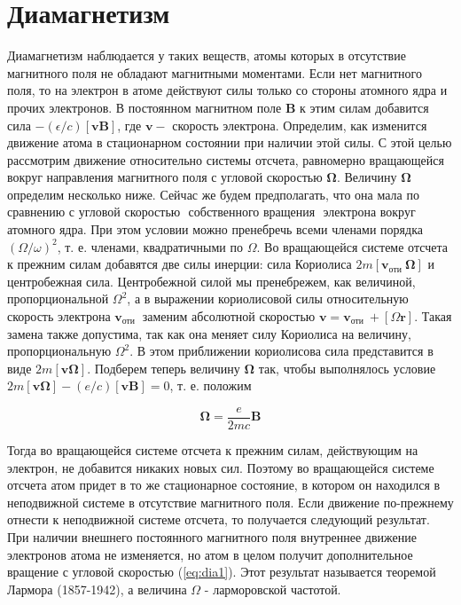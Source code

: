 \documentclass[12pt]{article}
\begin{document}
  \section{Диамагнетизм}
  Диамагнетизм наблюдается у таких веществ, атомы которых в отсутствие магнитного поля не обладают магнитными моментами. Если нет магнитного поля, то на электрон в атоме действуют силы только со стороны атомного ядра и прочих электронов. В постоянном магнитном поле $\mathbf{B}$ к этим силам добавится сила $-(\epsilon / c)[\mathbf{v B}]$, где $\mathbf{v}-$ скорость электрона. Определим, как изменится движение атома в стационарном состоянии при наличии этой силы. С этой целью рассмотрим движение относительно системы отсчета, равномерно вращающейся
  вокруг направления магнитного поля с угловой скоростью $\boldsymbol{\Omega}$. Величину $\boldsymbol{\Omega}$ определим несколько ниже. Сейчас же будем предполагать, что она мала по сравнению с угловой скоростью $\boldsymbol{\text { собственного вращения }}$ электрона вокруг атомного ядра. При этом условии можно пренебречь всеми членами порядка $(\Omega / \omega)^2$, т. е. членами, квадратичными по $\Omega$. Во вращающейся системе отсчета к прежним силам добавятся две силы инерции: сила Кориолиса $2 m\left[\mathbf{v}_{\text {оти }} \boldsymbol{\Omega}\right]$ и центробежная сила. Центробежной силой мы пренебрежем, как величиной, пропорциональной $\Omega^2$, а в выражении кориолисовой силы относительную скорость электрона $\mathbf{v}_{\text {оти }}$ заменим абсолютной скоростью $\mathbf{v}=\mathbf{v}_{\text {оти }}+[\Omega \mathbf{r}]$. Такая замена также допустима, так как она меняет силу Кориолиса на величину, пропорциональную $\Omega^2$. В этом приближении кориолисова сила представится в виде $2 m[\mathbf{v} \boldsymbol{\Omega}]$. Подберем теперь величину $\boldsymbol{\Omega}$ так, чтобы выполнялось условие $2 m[\mathbf{v} \boldsymbol{\Omega}]-(e / c)[\mathbf{v B}]=0$, т. е. положим

  \begin{equation}
  \label{eq:dia1}
  \boldsymbol{\Omega}=\frac{e}{2 m c} \mathbf{B}
  \end{equation}

  Тогда во вращающейся системе отсчета к прежним силам, действующим на электрон, не добавится никаких новых сил. Поэтому во вращающейся системе отсчета атом придет в то же стационарное состояние, в котором он находился в неподвижной системе в отсутствие магнитного поля. Если движение по-прежнему отнести к неподвижной системе отсчета, то получается следующий результат. При наличии внешнего постоянного магнитного поля внутреннее движение электронов атома не изменяется, но атом в целом получит дополнительное вращение с угловой скоростью (\ref{eq:dia1}). Этот результат называется теоремой Лармора (1857-1942), а величина $\Omega$ - ларморовской частотой.
\end{document}
